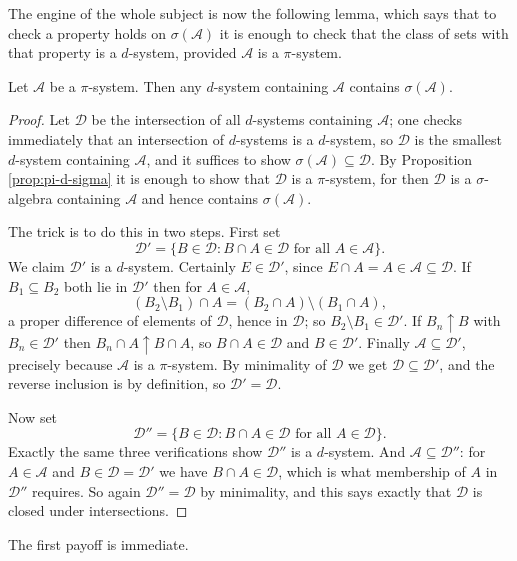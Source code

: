\documentclass[a4paper]{scrartcl}
\newcommand{\cA}{\mathcal{A}}
\newcommand{\cD}{\mathcal{D}}
\begin{document}
The engine of the whole subject is now the following lemma, which says that to check a property holds on $\sigma(\cA)$ it is enough to check that the class of sets with that property is a $d$-system, provided $\cA$ is a $\pi$-system.

\begin{lemma}\label{lem:dynkin}
	Let $\cA$ be a $\pi$-system. Then any $d$-system containing $\cA$ contains $\sigma(\cA)$.
\end{lemma}
\begin{proof}
	Let $\cD$ be the intersection of all $d$-systems containing $\cA$; one checks immediately that an intersection of $d$-systems is a $d$-system, so $\cD$ is the smallest $d$-system containing $\cA$, and it suffices to show $\sigma(\cA) \subseteq \cD$. By Proposition \ref{prop:pi-d-sigma} it is enough to show that $\cD$ is a $\pi$-system, for then $\cD$ is a $\sigma$-algebra containing $\cA$ and hence contains $\sigma(\cA)$.

	The trick is to do this in two steps. First set
	$$
	\cD' = \{ B \in \cD : B \cap A \in \cD \text{ for all } A \in \cA \}.
	$$
	We claim $\cD'$ is a $d$-system. Certainly $E \in \cD'$, since $E \cap A = A \in \cA \subseteq \cD$. If $B_1 \subseteq B_2$ both lie in $\cD'$ then for $A \in \cA$,
	$$
	(B_2 \setminus B_1) \cap A = (B_2 \cap A) \setminus (B_1 \cap A),
	$$
	a proper difference of elements of $\cD$, hence in $\cD$; so $B_2 \setminus B_1 \in \cD'$. If $B_n \uparrow B$ with $B_n \in \cD'$ then $B_n \cap A \uparrow B \cap A$, so $B \cap A \in \cD$ and $B \in \cD'$. Finally $\cA \subseteq \cD'$, precisely because $\cA$ is a $\pi$-system. By minimality of $\cD$ we get $\cD \subseteq \cD'$, and the reverse inclusion is by definition, so $\cD' = \cD$.

	Now set
	$$
	\cD'' = \{ B \in \cD : B \cap A \in \cD \text{ for all } A \in \cD \}.
	$$
	Exactly the same three verifications show $\cD''$ is a $d$-system. And $\cA \subseteq \cD''$: for $A \in \cA$ and $B \in \cD = \cD'$ we have $B \cap A \in \cD$, which is what membership of $A$ in $\cD''$ requires. So again $\cD'' = \cD$ by minimality, and this says exactly that $\cD$ is closed under intersections.
\end{proof}

The first payoff is immediate.
\end{document}
